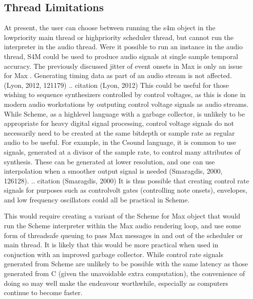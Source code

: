 \documentclass[letterpaper,10pt,english]{sphinxmanual}
\begin{document}
\subsection{Thread Limitations}
\label{\detokenize{conclusion:thread-limitations}}
\sphinxAtStartPar
At present, the user can choose between running the s4m object in the
low\sphinxhyphen{}priority main thread or high\sphinxhyphen{}priority scheduler thread, but cannot
run the interpreter in the audio thread.
Were it possible to run an instance in the audio thread, S4M could be
used to produce audio signals at single sample temporal accuracy.
The previously discussed jitter of event onsets in Max is only an issue
for Max . Generating timing data as part of an audio stream
is not affected. (Lyon, 2012, 121\sphinxhyphen{}179)
.. citation (Lyon, 2012)
This could be useful for those wishing to sequence synthesizers controlled
by control voltages, as this is done in modern audio workstations by outputing
control voltage signals as audio streams.
While Scheme, as a high\sphinxhyphen{}level language with a garbage collector, is unlikely
to be appropriate for heavy digital signal processing, control voltage
signals do not necessarily need to be created at the same bit\sphinxhyphen{}depth or
sample rate as regular audio to be useful. For example, in the Csound language,
it is common to use  signals, generated at a divisor of the sample
rate, to control many attributes of synthesis. These can be generated
at lower resolution, and one can use interpolation when a smoother output
signal is needed (Smaragdis, 2000, 126\sphinxhyphen{}128).
.. citation (Smaragdis, 2000)
It is thus possible that creating
control rate signals for purposes such as control\sphinxhyphen{}volt gates (controlling note onsets),
envelopes, and low frequency oscillators could all be practical in Scheme.

\sphinxAtStartPar
This would require creating a variant of the Scheme for Max object that would
run the Scheme interpreter within the Max audio rendering loop,
and use some form of thread\sphinxhyphen{}safe queuing to pass Max messages in and out of the
scheduler or main thread.
It is likely that this would be more practical when used in conjuction with
an improved garbage collector.
While control rate signals generated from Scheme are unlikely to be possible
with the same latency as those generated from C (given the unavoidable extra
computation), the convenience of doing so may well make the endeavour worthwhile,
especially as computers continue to become faster.
\end{document}
